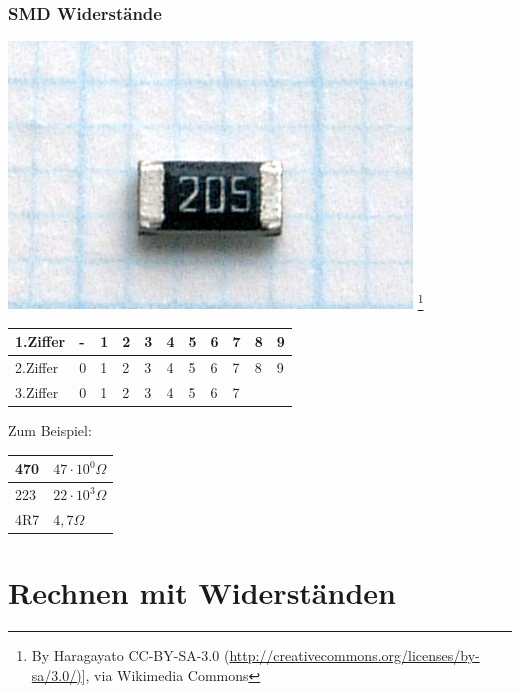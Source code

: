 \begin{frame}
    \frametitle{SMD Widerstände}
    \begin{center}
        \includegraphics[width=.3\textwidth]{e04/Rsistor_SMD.jpg}
        \footnote{\tiny By Haragayato CC-BY-SA-3.0 (\url{http://creativecommons.org/licenses/by-sa/3.0/)}], via Wikimedia Commons}
    \end{center}
    
    \begin{center}
    \begin{tabular}{l||l|l|l|l|l|l|l|l|l|l}\hline
        1.Ziffer & - & 1 &2 & 3 & 4 & 5 & 6 & 7 & 8 & 9 \\ \hline
        2.Ziffer & 0 & 1 &2 & 3 & 4 & 5 & 6 & 7 & 8 & 9 \\ \hline
        3.Ziffer & 0 & 1 &2 & 3 & 4 & 5 & 6 & 7 &  &  \\ \hline
    \end{tabular}
    \end{center}
    Zum Beispiel:
    \begin{center}
    \begin{tabular}{l||l}\hline
        470 & $47 \cdot 10^{0} \Omega$ \\ \hline
        223 & $22 \cdot 10^{3} \Omega$ \\ \hline
        4R7 & $4,7 \Omega$ \\ \hline
    \end{tabular}
    \end{center}

\end{frame}

\section*{Rechnen mit Widerständen}

